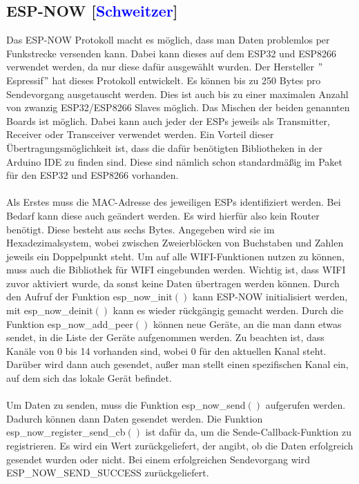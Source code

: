 \documentclass[titlepage,12pt,twoside]{article}
\begin{document}
\subsection{ESP-NOW [\textcolor{blue}{Schweitzer}]}
\label{chap:ESP-NOW}
Das ESP-NOW Protokoll macht es möglich, dass man Daten problemlos per 
Funkstrecke versenden kann. Dabei kann dieses auf dem ESP32 und ESP8266 
verwendet werden, da nur diese dafür ausgewählt wurden. Der Hersteller 
$"$Espressif$"$ hat dieses Protokoll entwickelt. Es können bis zu 250 Bytes 
pro Sendevorgang ausgetauscht werden. Dies ist auch bis zu einer maximalen Anzahl 
von zwanzig ESP32/ESP8266 Slaves möglich. Das Mischen der beiden genannten 
Boards ist möglich. Dabei kann auch jeder der ESPs jeweils als Transmitter, 
Receiver oder Transceiver verwendet werden. Ein Vorteil dieser Übertragungsmöglichkeit 
ist, dass die dafür benötigten Bibliotheken in der Arduino IDE zu finden 
sind. Diese sind nämlich schon standardmäßig im Paket für den ESP32 und 
ESP8266 vorhanden. \\
\\
Als Erstes muss die MAC-Adresse des jeweiligen ESPs identifiziert werden. 
Bei Bedarf kann diese auch geändert werden. Es wird hierfür also kein 
Router benötigt. Diese besteht aus sechs Bytes. Angegeben wird sie im 
Hexadezimalsystem, wobei zwischen Zweierblöcken von Buchstaben und Zahlen 
jeweils ein Doppelpunkt steht. Um auf alle WIFI-Funktionen nutzen zu können, 
muss auch die Bibliothek für WIFI eingebunden werden. Wichtig ist, dass WIFI 
zuvor aktiviert wurde, da sonst keine Daten übertragen werden können. Durch 
den Aufruf der Funktion esp\_now\_init$()$ kann ESP-NOW initialisiert werden, 
mit esp\_now\_deinit$()$ kann es wieder rückgängig gemacht werden. Durch die 
Funktion esp\_now\_add\_peer$()$ können neue Geräte, an die man dann etwas sendet, 
in die Liste der Geräte aufgenommen werden. Zu beachten ist, dass Kanäle von 0 bis 14 vorhanden 
sind, wobei 0 für den aktuellen Kanal steht. Darüber wird dann auch gesendet, 
außer man stellt einen spezifischen Kanal ein, auf dem sich das lokale Gerät 
befindet. \\
\\
Um Daten zu senden, muss die Funktion esp\_now\_send$()$ aufgerufen werden. 
Dadurch können dann Daten gesendet werden. Die Funktion esp\_now\_register\_send\_cb$()$ 
ist dafür da, um die Sende-Callback-Funktion zu registrieren. Es wird ein 
Wert zurückgeliefert, der angibt, ob die Daten erfolgreich gesendet wurden oder 
nicht. Bei einem erfolgreichen Sendevorgang wird ESP\_NOW\_SEND\_SUCCESS zurückgeliefert. 
\end{document}
